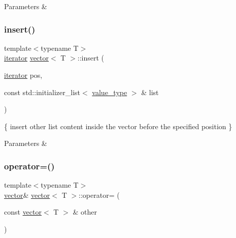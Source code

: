 \begin{DoxyParams}{Parameters}
{\em } & \\
\hline
\end{DoxyParams}
\mbox{\label{classvector_aa739fea25af5e923d1408118a6905ab0}} 
\subsubsection{\texorpdfstring{insert()}{insert()}\hspace{0.1cm}{\footnotesize\ttfamily [3/3]}}
{\footnotesize\ttfamily template$<$typename T$>$ \\
\hyperlink{classMyIterator}{iterator} \hyperlink{classvector}{vector}$<$ T $>$\+::insert (\begin{DoxyParamCaption}\item[{\hyperlink{classMyIterator}{iterator}}]{pos,  }\item[{const std\+::initializer\+\_\+list$<$ \hyperlink{classvector_a734f2f7bdca203914356632292c0c596}{value\+\_\+type} $>$ \&}]{list }\end{DoxyParamCaption})\hspace{0.3cm}{\ttfamily [inline]}}



\{ insert other list content inside the vector before the specified position \} 


\begin{DoxyParams}{Parameters}
{\em } & \\
\hline
\end{DoxyParams}
\mbox{\label{classvector_a32e6ef13224cb61af56c446a2570225b}} 
\subsubsection{\texorpdfstring{operator=()}{operator=()}\hspace{0.1cm}{\footnotesize\ttfamily [1/3]}}
{\footnotesize\ttfamily template$<$typename T$>$ \\
\hyperlink{classvector}{vector}\& \hyperlink{classvector}{vector}$<$ T $>$\+::operator= (\begin{DoxyParamCaption}\item[{const \hyperlink{classvector}{vector}$<$ T $>$ \&}]{other }\end{DoxyParamCaption})\hspace{0.3cm}{\ttfamily [inline]}}



